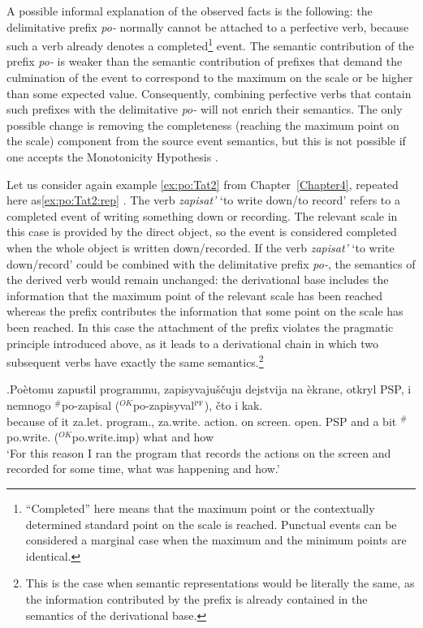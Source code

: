 A possible informal explanation of the observed facts is the following: the delimitative prefix \textit{po-} normally cannot be attached to a perfective verb, because such a verb already denotes a completed\footnote{``Completed'' here means that the maximum point or the contextually determined standard point on the scale is reached. Punctual events can be considered a marginal case when the maximum and the minimum points are identical.} event. The semantic contribution of the prefix \textit{po-} is weaker than the semantic contribution of prefixes that demand the culmination of the event to correspond to the maximum on the scale or be higher than some expected value. Consequently, combining perfective verbs that contain such prefixes with the delimitative \textit{po-} will not enrich their semantics. The only possible change is removing the completeness (reaching the maximum point on the scale) component from the source event semantics, but this is not possible if one accepts the Monotonicity Hypothesis \citep{Kiparsky:82}.

Let us consider again example \ref{ex:po:Tat2} from Chapter~\ref{Chapter4}, repeated here as\ref{ex:po:Tat2:rep} \citet{Tatevosov:09}. The verb \textit{zapisat'} `to write down/to record' refers to a completed event of writing something down or recording. The relevant scale in this case is provided by the direct object, so the event is considered completed when the whole object is written down/recorded. If the verb \textit{zapisat'} `to write down/record' could be combined with the delimitative prefix \textit{po-}, the semantics of the derived verb would remain unchanged: the derivational base includes the information that the maximum point of the relevant scale has been reached whereas the prefix contributes the information that some point on the scale has been reached. In this case the attachment of the prefix violates the pragmatic principle introduced above, as it leads to a derivational chain in which two subsequent verbs have exactly the same semantics.\footnote{This is the case when semantic representations would be literally the same, as the information contributed by the prefix is already contained in the semantics of the derivational base.}

\exg.\label{ex:po:Tat2:rep}Po\`{e}tomu zapustil programmu, zapisyvaju\v{s}\v{c}uju dejstvija na \`{e}krane, otkryl PSP, i nemnogo $^\#$po-zapisal ($^{\textit{OK}}$po-zapisyval$^{\textsc{pf}}$), \v{c}to i kak.\\
{because of it} za.let. program., za.write. action. on screen. open. PSP and {a bit} $^\#$po.write. ($^{\textit{OK}}$po.write.imp) what and how\\
\trans `For this reason I ran the program that records the actions on the screen and recorded for some time, what was happening and how.'\\ 

